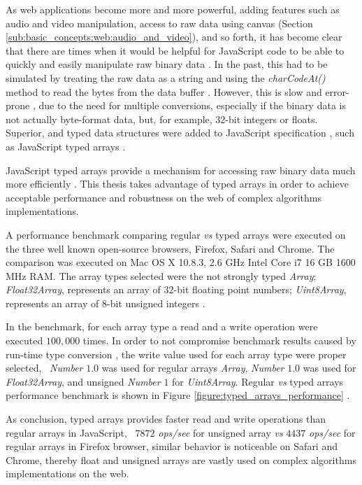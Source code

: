 As web applications become more and more powerful, adding features such as audio and video manipulation, access to raw data using canvas \cite{Canvas2013} (Section \ref{sub:basic_concepts:web:audio_and_video}), and so forth, it has become clear that there are times when it would be helpful for JavaScript \cite{International2009} code to be able to quickly and easily manipulate raw binary data \cite{Canvas2013,TypedArray2013}. In the past, this had to be simulated by treating the raw data as a string and using the \textit{charCodeAt()} method to read the bytes from the data buffer \cite{MDN2013,TypedArray2013}. However, this is slow and error-prone \cite{MDN2013}, due to the need for multiple conversions, especially if the binary data is not actually byte-format data, but, for example, 32-bit integers or floats. Superior, and typed data structures were added to JavaScript specification \cite{International2009}, such as JavaScript typed arrays \cite{MDN2013,International2009}.

JavaScript typed arrays provide a mechanism for accessing raw binary data much more efficiently \cite{MDN2013,TypedArray2013}. This thesis takes advantage of typed arrays in order to achieve acceptable performance and robustness on the web of complex algorithms implementations.

A performance benchmark comparing regular \textit{vs} typed arrays were executed on the three well known open-source browsers, Firefox, Safari and Chrome. The comparison was executed on Mac OS X 10.8.3, 2.6 GHz Intel Core i7 16 GB 1600 MHz RAM. The array types selected were the not strongly typed \textit{Array}; \textit{Float32Array}, represents an array of 32-bit floating point numbers; \textit{Uint8Array}, represents an array of 8-bit unsigned integers \cite{MDN2013}.

In the benchmark, for each array type a read and a write operation were executed $100,000$ times. In order to not compromise benchmark results caused by run-time type conversion \cite{International2009}, the write value used for each array type were proper selected, \eg\ \textit{Number} $1.0$ was used for regular arrays \textit{Array}, \textit{Number} $1.0$ was used for \textit{Float32Array}, and unsigned \textit{Number} $1$ for \textit{Uint8Array}. Regular \textit{vs} typed arrays performance benchmark is shown in Figure \ref{figure:typed_arrays_performance} \cite{TypedArrayPerformance2013}.

As conclusion, typed arrays provides faster read and write operations than regular arrays in JavaScript, \ie\ $7872$ \textit{ops/sec} for unsigned array \textit{vs} $4437$ \textit{ops/sec} for regular arrays in Firefox browser, similar behavior is noticeable on Safari and Chrome, thereby float and unsigned arrays are vastly used on complex algorithms implementations on the web.

